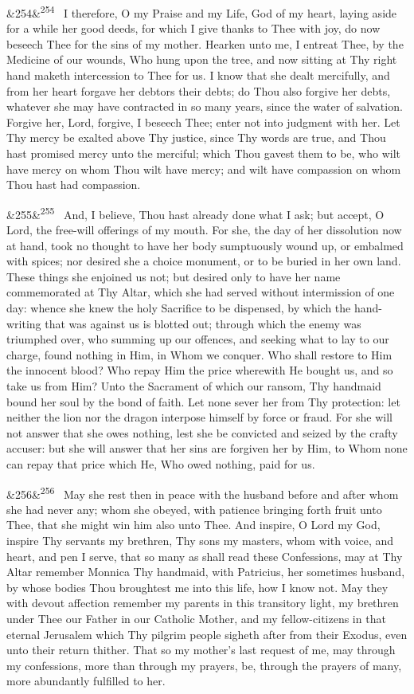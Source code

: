 \documentclass[12pt]{article}
\newcommand{\para}[1][]{\par\noindent\ifx&#1&\else\textsuperscript{\footnotesize #1}~\fi}
\begin{document}
\para[254] I therefore, O my Praise and my Life, God of my heart, laying aside for a while her good deeds, for which I give thanks to Thee with joy, do now beseech Thee for the sins of my mother. Hearken unto me, I entreat Thee, by the Medicine of our wounds, Who hung upon the tree, and now sitting at Thy right hand maketh intercession to Thee for us. I know that she dealt mercifully, and from her heart forgave her debtors their debts; do Thou also forgive her debts, whatever she may have contracted in so many years, since the water of salvation. Forgive her, Lord, forgive, I beseech Thee; enter not into judgment with her. Let Thy mercy be exalted above Thy justice, since Thy words are true, and Thou hast promised mercy unto the merciful; which Thou gavest them to be, who wilt have mercy on whom Thou wilt have mercy; and wilt have compassion on whom Thou hast had compassion.

\para[255] And, I believe, Thou hast already done what I ask; but accept, O Lord, the free-will offerings of my mouth. For she, the day of her dissolution now at hand, took no thought to have her body sumptuously wound up, or embalmed with spices; nor desired she a choice monument, or to be buried in her own land. These things she enjoined us not; but desired only to have her name commemorated at Thy Altar, which she had served without intermission of one day: whence she knew the holy Sacrifice to be dispensed, by which the hand-writing that was against us is blotted out; through which the enemy was triumphed over, who summing up our offences, and seeking what to lay to our charge, found nothing in Him, in Whom we conquer. Who shall restore to Him the innocent blood? Who repay Him the price wherewith He bought us, and so take us from Him? Unto the Sacrament of which our ransom, Thy handmaid bound her soul by the bond of faith. Let none sever her from Thy protection: let neither the lion nor the dragon interpose himself by force or fraud. For she will not answer that she owes nothing, lest she be convicted and seized by the crafty accuser: but she will answer that her sins are forgiven her by Him, to Whom none can repay that price which He, Who owed nothing, paid for us.

\para[256] May she rest then in peace with the husband before and after whom she had never any; whom she obeyed, with patience bringing forth fruit unto Thee, that she might win him also unto Thee. And inspire, O Lord my God, inspire Thy servants my brethren, Thy sons my masters, whom with voice, and heart, and pen I serve, that so many as shall read these Confessions, may at Thy Altar remember Monnica Thy handmaid, with Patricius, her sometimes husband, by whose bodies Thou broughtest me into this life, how I know not. May they with devout affection remember my parents in this transitory light, my brethren under Thee our Father in our Catholic Mother, and my fellow-citizens in that eternal Jerusalem which Thy pilgrim people sigheth after from their Exodus, even unto their return thither. That so my mother's last request of me, may through my confessions, more than through my prayers, be, through the prayers of many, more abundantly fulfilled to her.
\end{document}
